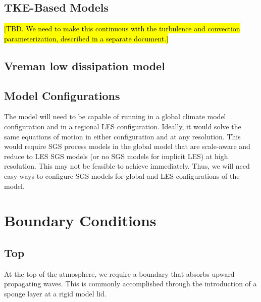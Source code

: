 \documentclass{article}
\begin{document}
\subsection{TKE-Based Models}

\citep{Deardorff80a}

\hl{[TBD. We need to make this continuous with the turbulence and convection parameterization, described in a separate document.]}

\subsection{Vreman low dissipation model }

\citep{vreman2004}

\subsection{Model Configurations} 

The model will need to be capable of running in a global climate model configuration and in a regional LES configuration. Ideally, it would solve the same equations of motion in either configuration and at any resolution. This would require SGS process models in the global model that are scale-aware and reduce to LES SGS models (or no SGS models for implicit LES) at high resolution. This may not be feasible to achieve immediately. Thus, we will need easy ways to configure SGS models for global and LES configurations of the model. 

\section{Boundary Conditions}\label{sct:bc}

\subsection{Top} 
At the top of the atmosphere, we require a boundary that absorbs upward propagating waves. This is commonly accomplished through the introduction of a sponge layer at a rigid model lid. 
\end{document}

